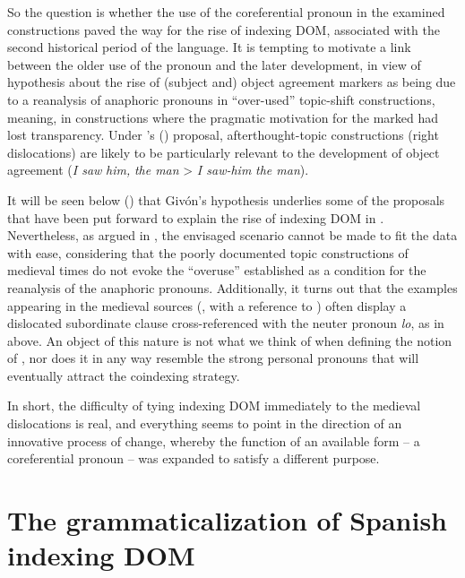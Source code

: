 \documentclass[output=paper]{LSP/langsci}
\begin{document}
 So the question is whether the use of the coreferential pronoun in the examined constructions paved the way for the rise of indexing DOM, associated with the second historical period of the  language. It is tempting to motivate a link between the older use of the pronoun and the later development, in view of  hypothesis about the rise of (subject and) object agreement markers as being due to a reanalysis of anaphoric pronouns in “over-used” topic-shift constructions, meaning, in constructions where the pragmatic motivation for the marked  had lost transparency. Under \citeauthor{Givon1976Topic}'s (\citeyear[156–157]{Givon1976Topic})  proposal, afterthought-topic constructions (right dislocations) are likely to be particularly relevant to the development of object agreement (\cf \textit{I saw} \textit{him}\textit{,} \textit{the man} > \textit{I saw-}\textit{him} \textit{the man}).

 It will be seen below () that Givón’s hypothesis underlies some of the proposals that have been put forward to explain the rise of indexing DOM in . Nevertheless, as argued in  \citet[279]{Rozasetal2012Object}, the envisaged scenario cannot be made to fit the  data with ease, considering that the poorly documented topic constructions of medieval times do not evoke the “overuse” established as a condition for the reanalysis of the anaphoric pronouns. Additionally, it turns out that the examples appearing in the medieval sources (\citealt[279]{Rozasetal2012Object}, with a reference to \citealt{Riiho1988Redundancia}) often display a dislocated subordinate clause cross-referenced with the neuter pronoun \textit{lo}, as in  above. An object of this nature is not what we think of when defining the notion of , nor does it in any way resemble the strong personal pronouns that will eventually attract the coindexing strategy.

 In short, the difficulty of tying indexing DOM immediately to the medieval dislocations is real, and everything seems to point in the direction of an innovative process of change, whereby the function of an available form – a coreferential pronoun – was expanded to satisfy a different purpose. 

\section{The grammaticalization of Spanish indexing DOM}\label{04-me-sec:4}
\end{document}
